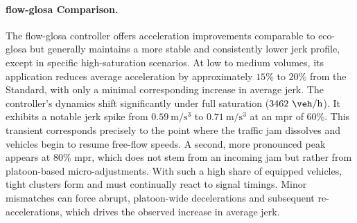 \paragraph{\ac{flow-glosa} Comparison.}
The \ac{flow-glosa} controller offers acceleration improvements comparable to \ac{eco-glosa} but generally maintains a more stable and consistently lower jerk profile, except in specific high-saturation scenarios. At low to medium volumes, its application reduces average acceleration by approximately $15\%$ to $20\%$ from the Standard, with only a minimal corresponding increase in average jerk.
\mynewline
The controller's dynamics shift significantly under full saturation ($3462~\unit{\veh\per\hour}$). It exhibits a notable jerk spike from $0.59~\unit{\metre\per\second\cubed}$ to $0.71~\unit{\metre\per\second\cubed}$ at an \ac{mpr} of $60\%$. This transient corresponds precisely to the point where the traffic jam dissolves and vehicles begin to resume free-flow speeds. A second, more pronounced peak appears at $80\%$ \ac{mpr}, which does not stem from an incoming jam but rather from platoon-based micro-adjustments. With such a high share of equipped vehicles, tight clusters form and must continually react to signal timings. Minor mismatches can force abrupt, platoon-wide decelerations and subsequent re-accelerations, which drives the observed increase in average jerk.

